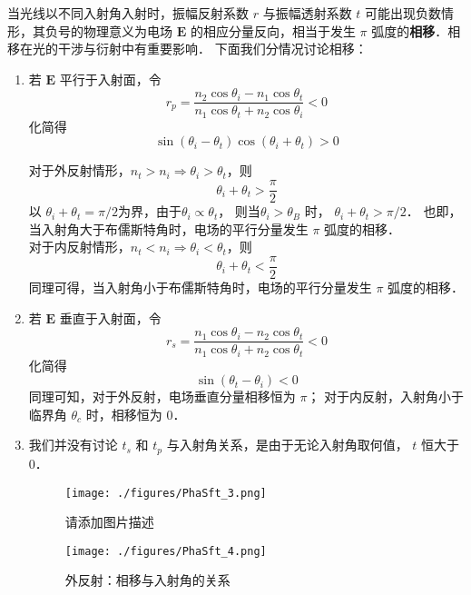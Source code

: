
\begin{issues}
\issueMissDepend
\end{issues}


当光线以不同入射角入射时，振幅反射系数 $r$ 与振幅透射系数 $t$  可能出现负数情形，其负号的物理意义为电场 $\boldsymbol{E}$ 的相应分量反向，相当于发生 $\pi$ 弧度的\textbf{相移}．相移在光的干涉与衍射中有重要影响．
下面我们分情况讨论相移：
\begin{enumerate}
\item 若 $\boldsymbol{E}$ 平行于入射面，令
$$ r_p =  \dfrac{n_2\cos{\theta_i} - n_1\cos\theta_t}{n_1\cos\theta_t + n_2\cos\theta_i} < 0 $$
化简得
$$ \sin(\theta_i - \theta_t)\cos(\theta_i + \theta_t) > 0$$

对于外反射情形，$n_t > n_i \Rightarrow \theta_i > \theta_t$，则
$$\theta_i + \theta_t > \frac{\pi}{2}$$
以 $\theta_i + \theta_t = \pi/2$为界，由于$\theta_i \propto \theta_t$， 则当$\theta_i > \theta_B$ 时， $\theta_i + \theta_t > \pi/2$． 也即，当入射角大于布儒斯特角时，电场的平行分量发生 $\pi$ 弧度的相移．\\

对于内反射情形，$ n_t < n_i \Rightarrow \theta_i < \theta_t$，则
$$\theta_i + \theta_t < \frac{\pi}{2}$$
同理可得，当入射角小于布儒斯特角时，电场的平行分量发生 $\pi$ 弧度的相移．

\item 若 $\boldsymbol{E}$ 垂直于入射面，令
$$r_s  = \frac{n_1\cos{\theta_i} - n_2\cos\theta_t}{n_1\cos\theta_i + n_2\cos\theta_t} < 0$$
化简得
$$\sin(\theta_t - \theta_i) < 0$$
同理可知，对于外反射，电场垂直分量相移恒为 $\pi$； 对于内反射，入射角小于临界角 $\theta_c$ 时，相移恒为 0．\\

\item 我们并没有讨论 $t_s$ 和 $t_p$ 与入射角关系，是由于无论入射角取何值， $ t$ 恒大于0．

\begin{figure}[ht]
\centering
\texttt{[image: ./figures/PhaSft\_3.png]}
\caption{请添加图片描述} \label{PhaSft_fig3}
\end{figure}

\begin{figure}[ht]
\centering
\texttt{[image: ./figures/PhaSft\_4.png]}
\caption{外反射：相移与入射角的关系} \label{PhaSft_fig4}
\end{figure}
\end{enumerate}

